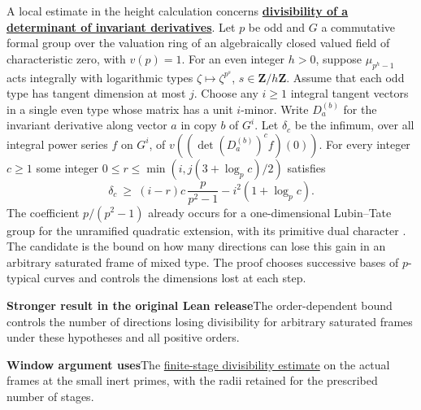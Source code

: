 \documentclass[11pt,a4paper]{article}
\newcommand{\rhscopelabel}[2]{%
  {\setlength{\fboxsep}{2pt}\colorbox{#1}{%
    \small\sffamily\bfseries\color{PageInk}#2}}}
\newcommand{\rhrange}[3][Stronger result in the original Lean release]{%
  \par\addvspace{.45\baselineskip}\Needspace{4\baselineskip}%
  \begingroup\setlength{\leftskip}{.65em}\setlength{\parindent}{0pt}%
  \noindent\rhscopelabel{TraceTint}{#1}\enspace#2\par
  \nobreak\smallskip
  \noindent\rhscopelabel{FieldTint}{Window argument uses}\enspace#3\par
  \endgroup\addvspace{.45\baselineskip}}
\begin{document}
A local estimate in the height calculation concerns
\textbf{\hyperlink{candidate.mixed-determinant-depth}{divisibility of a
determinant of invariant derivatives}}. Let \(p\) be odd and
\(G\) a commutative formal group over the valuation ring of an
algebraically closed valued field of characteristic zero, with
\(v(p)=1\). For an even integer \(h>0\), suppose
\(\mu_{p^h-1}\) acts integrally with logarithmic types
\(\zeta\mapsto\zeta^{p^s}\), \(s\in\mathbf Z/h\mathbf Z\).
Assume that each odd type has tangent dimension at most \(j\).
Choose any \(i\ge1\) integral tangent vectors in a single even
type whose matrix has a unit \(i\)-minor. Write \(D_a^{(b)}\)
for the invariant derivative along vector \(a\) in copy \(b\)
of \(G^i\). Let \(\delta_c\) be the infimum, over all integral
power series \(f\) on \(G^i\), of
\(v((\det(D_a^{(b)})^c f)(0))\). For every integer \(c\ge1\)
some integer \(0\le r\le\min(i,j(3+\log_p c)/2)\) satisfies
\[
 \delta_c\ \ge\ (i-r)c\,\frac{p}{p^2-1}-i^2(1+\log_p c).
\]
The coefficient \(p/(p^2-1)\) already occurs for a
one-dimensional Lubin--Tate group for the unramified quadratic
extension, with its primitive dual character
\cite[\S V]{depth-katz}\cite[Appendix, Theorem~(c)]{depth-lubin-tate}.
The candidate is the bound on how many directions can lose this
gain in an arbitrary saturated frame of mixed type. The proof
chooses successive bases of \(p\)-typical curves and controls the
dimensions lost at each step.
\rhrange{The order-dependent bound controls the number of directions
losing divisibility for arbitrary saturated frames under these
hypotheses and all positive orders.}
{The \hyperlink{proof.mixed-determinant-multiradius}{finite-stage
divisibility estimate} on the actual frames at the small inert primes,
with the radii retained for the prescribed number of stages.}
\end{document}
